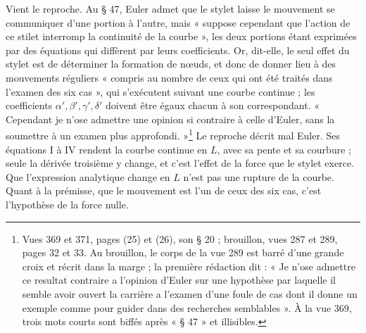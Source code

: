 \documentclass[11pt,a4paper]{article}
\begin{document}
Vient le reproche. Au § 47, Euler admet que le stylet laisse le mouvement se communiquer d'une portion à l'autre, mais « suppose cependant que l'action de ce stilet interromp la continuité de la courbe », les deux portions étant exprimées par des équations qui diffèrent par leurs coefficients. Or, dit-elle, le seul effet du stylet est de déterminer la formation de nœuds, et donc de donner lieu à des mouvements réguliers « compris au nombre de ceux qui ont été traités dans l'examen des six cas », qui s'exécutent suivant une courbe continue ; les coefficients $\alpha',\beta',\gamma',\delta'$ doivent être égaux chacun à son correspondant. « Cependant je n'ose admettre une opinion si contraire à celle d'Euler, sans la soumettre à un examen plus approfondi. »\footnote{Vues 369 et 371, pages (25) et (26), son § 20 ; brouillon, vues 287 et 289, pages 32 et 33. Au brouillon, le corps de la vue 289 est barré d'une grande croix et récrit dans la marge ; la première rédaction dit : « Je n'ose admettre ce resultat contraire a l'opinion d'Euler sur une hypothèse par laquelle il semble avoir ouvert la carrière a l'examen d'une foule de cas dont il donne un exemple comme pour guider dans des recherches semblables ». À la vue 369, trois mots courts sont biffés après « § 47 » et illisibles.} Le reproche décrit mal Euler. Ses équations I à IV rendent la courbe continue en $L$, avec sa pente et sa courbure ; seule la dérivée troisième y change, et c'est l'effet de la force que le stylet exerce. Que l'expression analytique change en $L$ n'est pas une rupture de la courbe. Quant à la prémisse, que le mouvement est l'un de ceux des six cas, c'est l'hypothèse de la force nulle.
\end{document}
